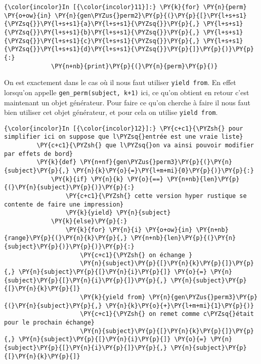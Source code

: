     \begin{Verbatim}[commandchars=\\\{\}]
{\color{incolor}In [{\color{incolor}11}]:} \PY{k}{for} \PY{n}{perm} \PY{o+ow}{in} \PY{n}{gen\PYZus{}perm2}\PY{p}{(}\PY{p}{[}\PY{l+s+s1}{\PYZsq{}}\PY{l+s+s1}{a}\PY{l+s+s1}{\PYZsq{}}\PY{p}{,} \PY{l+s+s1}{\PYZsq{}}\PY{l+s+s1}{b}\PY{l+s+s1}{\PYZsq{}}\PY{p}{,} \PY{l+s+s1}{\PYZsq{}}\PY{l+s+s1}{c}\PY{l+s+s1}{\PYZsq{}}\PY{p}{,} \PY{l+s+s1}{\PYZsq{}}\PY{l+s+s1}{d}\PY{l+s+s1}{\PYZsq{}}\PY{p}{]}\PY{p}{)}\PY{p}{:}
             \PY{n+nb}{print}\PY{p}{(}\PY{n}{perm}\PY{p}{)}
\end{Verbatim}


    On est exactement dans le cas où il nous faut utiliser
\texttt{yield\ from}. En effet lorsqu'on appelle
\texttt{gen\_perm(subject,\ k+1)} ici, ce qu'on obtient en retour c'est
maintenant un objet générateur. Pour faire ce qu'on cherche à faire il
nous faut bien utiliser cet objet générateur, et pour cela on utilise
\texttt{yield\ from}.

    \begin{Verbatim}[commandchars=\\\{\}]
{\color{incolor}In [{\color{incolor}12}]:} \PY{c+c1}{\PYZsh{} pour simplifier ici on suppose que l\PYZsq{}entrée est une vraie liste}
         \PY{c+c1}{\PYZsh{} que l\PYZsq{}on va ainsi pouvoir modifier par effets de bord}
         \PY{k}{def} \PY{n+nf}{gen\PYZus{}perm3}\PY{p}{(}\PY{n}{subject}\PY{p}{,} \PY{n}{k}\PY{o}{=}\PY{l+m+mi}{0}\PY{p}{)}\PY{p}{:}
             \PY{k}{if} \PY{n}{k} \PY{o}{==} \PY{n+nb}{len}\PY{p}{(}\PY{n}{subject}\PY{p}{)}\PY{p}{:}
                 \PY{c+c1}{\PYZsh{} cette version hyper rustique se contente de faire une impression}
                 \PY{k}{yield} \PY{n}{subject}
             \PY{k}{else}\PY{p}{:}
                 \PY{k}{for} \PY{n}{i} \PY{o+ow}{in} \PY{n+nb}{range}\PY{p}{(}\PY{n}{k}\PY{p}{,} \PY{n+nb}{len}\PY{p}{(}\PY{n}{subject}\PY{p}{)}\PY{p}{)}\PY{p}{:}
                     \PY{c+c1}{\PYZsh{} on échange }
                     \PY{n}{subject}\PY{p}{[}\PY{n}{k}\PY{p}{]}\PY{p}{,} \PY{n}{subject}\PY{p}{[}\PY{n}{i}\PY{p}{]} \PY{o}{=} \PY{n}{subject}\PY{p}{[}\PY{n}{i}\PY{p}{]}\PY{p}{,} \PY{n}{subject}\PY{p}{[}\PY{n}{k}\PY{p}{]}
                     \PY{k}{yield from} \PY{n}{gen\PYZus{}perm3}\PY{p}{(}\PY{n}{subject}\PY{p}{,} \PY{n}{k}\PY{o}{+}\PY{l+m+mi}{1}\PY{p}{)}
                     \PY{c+c1}{\PYZsh{} on remet comme c\PYZsq{}était pour le prochain échange}
                     \PY{n}{subject}\PY{p}{[}\PY{n}{k}\PY{p}{]}\PY{p}{,} \PY{n}{subject}\PY{p}{[}\PY{n}{i}\PY{p}{]} \PY{o}{=} \PY{n}{subject}\PY{p}{[}\PY{n}{i}\PY{p}{]}\PY{p}{,} \PY{n}{subject}\PY{p}{[}\PY{n}{k}\PY{p}{]}
\end{Verbatim}


